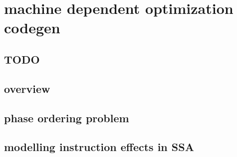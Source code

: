 \applynumberofpages\chapter{machine dependent optimization codegen }
\section{TODO}


\section{overview}
\section{phase ordering problem}
\section{modelling instruction effects in SSA}
